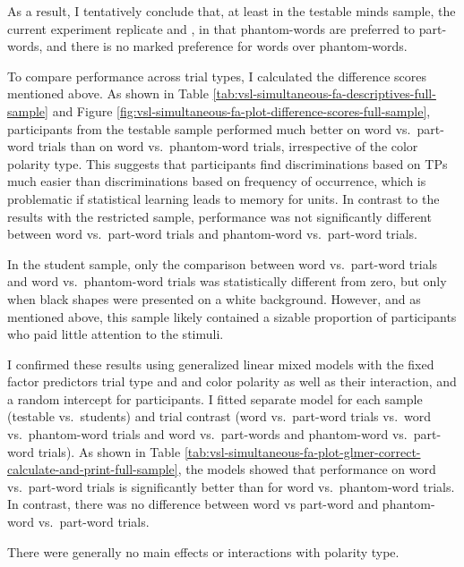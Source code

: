 \documentclass[
]{article}
\begin{document}
As a result, I tentatively conclude that, at least in the testable minds
sample, the current experiment replicate \citep{Endress-Phantoms} and
\citep{Endress-Phantoms-Vision}, in that phantom-words are preferred to
part-words, and there is no marked preference for words over
phantom-words.

To compare performance across trial types, I calculated the difference
scores mentioned above. As shown in Table
\ref{tab:vsl-simultaneous-fa-descriptives-full-sample} and Figure
\ref{fig:vsl-simultaneous-fa-plot-difference-scores-full-sample},
participants from the testable sample performed much better on word
vs.~part-word trials than on word vs.~phantom-word trials, irrespective
of the color polarity type. This suggests that participants find
discriminations based on TPs much easier than discriminations based on
frequency of occurrence, which is problematic if statistical learning
leads to memory for units. In contrast to the results with the
restricted sample, performance was not significantly different between
word vs.~part-word trials and phantom-word vs.~part-word trials.

In the student sample, only the comparison between word vs.~part-word
trials and word vs.~phantom-word trials was statistically different from
zero, but only when black shapes were presented on a white background.
However, and as mentioned above, this sample likely contained a sizable
proportion of participants who paid little attention to the stimuli.

I confirmed these results using generalized linear mixed models with the
fixed factor predictors trial type and and color polarity as well as
their interaction, and a random intercept for participants. I fitted
separate model for each sample (testable vs.~students) and trial
contrast (word vs.~part-word trials vs.~word vs.~phantom-word trials and
word vs.~part-words and phantom-word vs.~part-word trials). As shown in
Table
\ref{tab:vsl-simultaneous-fa-plot-glmer-correct-calculate-and-print-full-sample},
the models showed that performance on word vs.~part-word trials is
significantly better than for word vs.~phantom-word trials. In contrast,
there was no difference between word vs part-word and phantom-word
vs.~part-word trials.

There were generally no main effects or interactions with polarity type.

  
\end{document}
